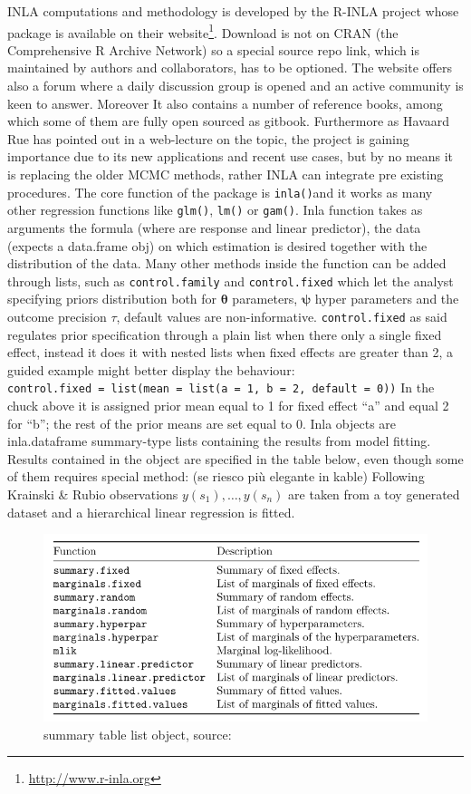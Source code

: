 \documentclass[
  12pt,
  a4paper,
  oneside]{book}
\DeclareRobustCommand{\href}[2]{#2\footnote{\url{#1}}}
\theoremstyle{definition}
\theoremstyle{definition}
\theoremstyle{definition}
\theoremstyle{remark}
\begin{document}
INLA computations and methodology is developed by the R-INLA project whose package is available on their \href{http://www.r-inla.org}{website}. Download is not on CRAN (the Comprehensive R Archive Network) so a special source repo link, which is maintained by authors and collaborators, has to be optioned. The website offers also a forum where a daily discussion group is opened and an active community is keen to answer. Moreover It also contains a number of reference books, among which some of them are fully open sourced as gitbook. Furthermore as Havaard Rue has pointed out in a web-lecture on the topic, the project is gaining importance due to its new applications and recent use cases, but by no means it is replacing the older MCMC methods, rather INLA can integrate pre existing procedures.
The core function of the package is \texttt{inla()}and it works as many other regression functions like \texttt{glm()}, \texttt{lm()} or \texttt{gam()}. Inla function takes as arguments the formula (where are response and linear predictor), the data (expects a data.frame obj) on which estimation is desired together with the distribution of the data. Many other methods inside the function can be added through lists, such as \texttt{control.family} and \texttt{control.fixed} which let the analyst specifying priors distribution both for \(\boldsymbol{\theta}\) parameters, \(\boldsymbol{\psi}\) hyper parameters and the outcome precision \(\tau\), default values are non-informative.
\texttt{control.fixed} as said regulates prior specification through a plain list when there only a single fixed effect, instead it does it with nested lists when fixed effects are greater than 2, a guided example might better display the behaviour:
\texttt{control.fixed\ =\ list(mean\ =\ list(a\ =\ 1,\ b\ =\ 2,\ default\ =\ 0))}
In the chuck above it is assigned prior mean equal to 1 for fixed effect ``a'' and equal 2 for ``b''; the rest of the prior means are set equal to 0.
Inla objects are inla.dataframe summary-type lists containing the results from model fitting. Results contained in the object are specified in the table below, even though some of them requires special method: (se riesco più elegante in kable)
Following Krainski \& Rubio \citeyearpar{Krainski-Rubio} observations \(y(s_{1}), \ldots, y(s_{n})\) are taken from a toy generated dataset and a hierarchical linear regression is fitted.

\begin{figure}
\centering
\includegraphics{images/summarytable.PNG}
\caption{summary table list object, source: \citet{Krainski-Rubio}}
\end{figure}
\end{document}
